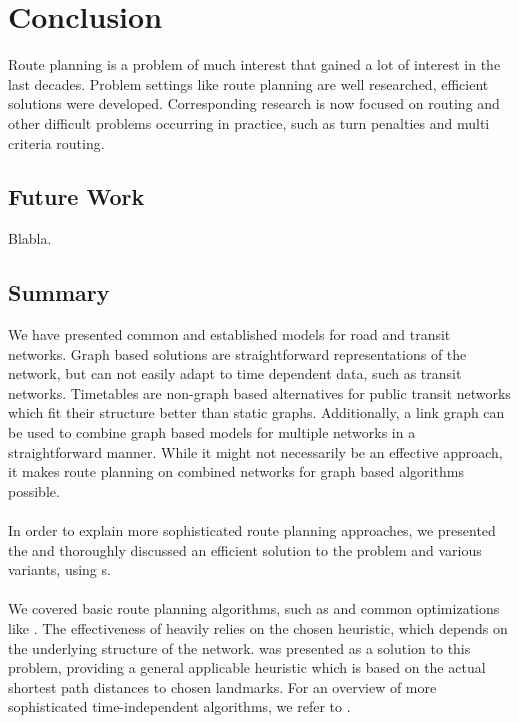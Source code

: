 \chapter{Conclusion}\label{conclusion}
	Route planning is a problem of much interest that gained a lot of interest in the last decades. Problem settings like \uniModal route planning are
	well researched, efficient solutions were developed. Corresponding research is now focused on \multiModal routing and other difficult problems
	occurring in practice, such as turn penalties and multi criteria routing.

\section{Future Work}
Blabla. 

\section{Summary}
	We have presented common and established models for road and transit networks. Graph based solutions are straightforward representations of the network,
	but can not easily adapt to time dependent data, such as transit networks. Timetables are non-graph based alternatives for public transit networks
	which fit their structure better than static graphs. Additionally, a link graph can be used to combine graph based models for multiple networks in a
	straightforward manner. While it might not necessarily be an effective approach, it makes route planning on combined networks for graph based
	algorithms possible.\\\\
	In order to explain more sophisticated route planning approaches, we presented the \nearestNeighborProblem and thoroughly discussed an
	efficient solution to the problem and various variants, using {\coverTree}s.\\\\
	We covered basic route planning algorithms, such as \dijkstra and common optimizations like \astar. The effectiveness of \astar heavily relies on the chosen
	heuristic, which depends on the underlying structure of the network. \alt was presented as a solution to this problem, providing a general applicable heuristic
	which is based on the actual shortest path distances to chosen landmarks. For an overview of more sophisticated \uniModal time-independent
	algorithms, we refer to .
	
